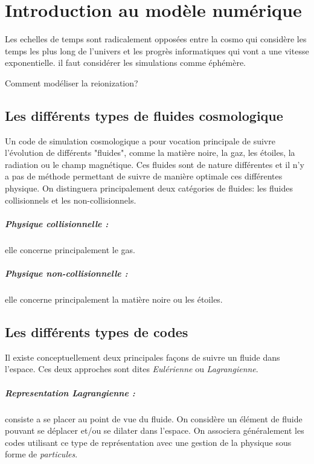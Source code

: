 \chapter{Introduction au modèle numérique}\label{ch:introduction}

Les echelles de temps sont radicalement opposées entre la cosmo qui considère les temps les plus long de l'univers et les progrès informatiques qui vont a une vitesse exponentielle. 
il faut considérer les simulations comme éphémère.

Comment modéliser la reionization?

\section{Les différents types de fluides cosmologique}

Un code de simulation cosmologique a pour vocation principale de suivre l'évolution de différents "fluides", comme la matière noire, la gaz, les étoiles, la radiation ou le champ magnétique.
Ces fluides sont de nature différentes et il n'y a pas de méthode permettant de suivre de manière optimale ces différentes physique.
On distinguera principalement deux catégories de fluides: les fluides collisionnels et les non-collisionnels.

\paragraph{Physique collisionnelle : } elle concerne principalement le gas.

\paragraph{Physique non-collisionnelle : } elle concerne principalement la matière noire ou les étoiles.




\section{Les différents types de codes}

Il existe conceptuellement deux principales façons de suivre un fluide dans l'espace.
Ces deux approches sont dites \emph{Eulérienne} ou \emph{Lagrangienne}.

\paragraph{Representation Lagrangienne : } 
consiste a se placer au point de vue du fluide.
On considère un élément de fluide pouvant se déplacer et/ou se dilater dans l'espace.
On associera généralement les codes utilisant ce type de représentation avec une gestion de la physique sous forme de \emph{particules}.

